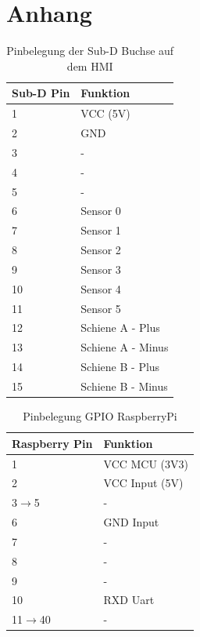 \documentclass[a4paper, 11pt]{report}
\begin{document}
\chapter{Anhang}


	\begin{table}[H]
	\centering
		\begin{tabular}{|l|l|}
			\hline
			\textbf{Sub-D Pin} &\textbf{Funktion}\\
			\hline
			\hline
			1 & VCC (5V)\\
			\hline
			2 & GND\\
			\hline
			3 & -\\
			\hline
			4 & -\\
			\hline
			5 & -\\
			\hline
			6 & Sensor 0\\
			\hline
			7 & Sensor 1\\
			\hline
			8 & Sensor 2\\
			\hline
			9 & Sensor 3\\
			\hline
			10 & Sensor 4\\
			\hline
			11 & Sensor 5\\
			\hline
			12 & Schiene A - Plus\\
			\hline
			13 & Schiene A - Minus\\
			\hline
			14 & Schiene B - Plus\\
			\hline
			15 & Schiene B - Minus\\
			\hline
		\end{tabular}
		\caption{Pinbelegung der Sub-D Buchse auf dem HMI}
		\label{tab:AnhangBelegungSUBD}
	\end{table}

	\begin{table}[H]
	\centering
		\begin{tabular}{|l|l|}
			\hline
			\textbf{Raspberry Pin} &\textbf{Funktion}\\
			\hline
			\hline
			1 & VCC MCU (3V3)\\
			\hline
			2 & VCC Input (5V)\\
			\hline
			3$\rightarrow$5 & -\\
			\hline
			6 & GND Input\\
			\hline
			7 & -\\
			\hline
			8 & -\\
			\hline
			9 & -\\
			\hline
			10 & RXD Uart\\
			\hline
			11$\rightarrow$40 & -\\
			\hline
		\end{tabular}
		\caption{Pinbelegung GPIO RaspberryPi}
		\label{tab:AnhangBelegungRPI}
	\end{table}
\end{document}
